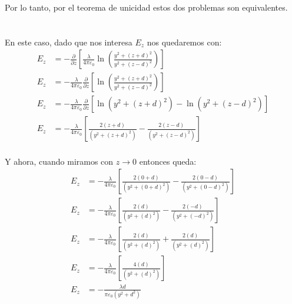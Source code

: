 \documentclass{report}
\begin{document}
Por lo tanto, por el teorema de unicidad estos dos problemas son equivalentes.

\section{}

En este caso, dado que nos interesa $E_z$ nos quedaremos con:
\begin{align*}
	E_z &= - \frac{\partial}{\partial z}\left[\frac{\lambda}{4\pi \varepsilon_0 } \ln \left( \frac{y^2 + \left( z + d \right)^2}{y^2 + \left( z - d \right)^2} \right)\right]\\
	E_z &= - \frac{\lambda}{4\pi \varepsilon_0 } \frac{\partial}{\partial z}\left[\ln \left( \frac{y^2 + \left( z + d \right)^2}{y^2 + \left( z - d \right)^2} \right)\right]\\
	E_z &= - \frac{\lambda}{4\pi \varepsilon_0 } \frac{\partial}{\partial z}\left[\ln \left( y^2 + \left( z + d \right)^2 \right) - \ln \left( y^2 + \left( z - d \right)^2 \right)\right]\\
	E_z &= - \frac{\lambda}{4\pi \varepsilon_0 } \left[ \frac{2 \left( z + d \right)}{\left( y^2 + \left( z + d \right)^2 \right)} - \frac{2 \left( z - d \right)}{\left( y^2 + \left( z - d \right)^2 \right)}\right]\\
\end{align*}

Y ahora, cuando miramos con $z \to 0$ entonces queda:
\begin{align*}
	E_z &= - \frac{\lambda}{4\pi \varepsilon_0 } \left[ \frac{2 \left( 0 + d \right)}{\left( y^2 + \left( 0 + d \right)^2 \right)} - \frac{2 \left( 0 - d \right)}{\left( y^2 + \left( 0 - d \right)^2 \right)}\right]\\
	E_z &= - \frac{\lambda}{4\pi \varepsilon_0 } \left[ \frac{2 \left( d \right)}{\left( y^2 + \left( d \right)^2 \right)} - \frac{2 \left( - d \right)}{\left( y^2 + \left(  - d \right)^2 \right)}\right]\\
	E_z &= - \frac{\lambda}{4\pi \varepsilon_0 } \left[ \frac{2 \left( d \right)}{\left( y^2 + \left( d \right)^2 \right)} + \frac{2 \left( d \right)}{\left( y^2 + \left(d \right)^2 \right)}\right]\\
	E_z &= - \frac{\lambda}{4\pi \varepsilon_0 } \left[ \frac{4 \left( d \right)}{\left( y^2 + \left( d \right)^2 \right)} \right]\\
	E_z &= - \frac{\lambda d}{\pi \varepsilon_0 \left( y^2 + d^2 \right)}
\end{align*}
\end{document}
